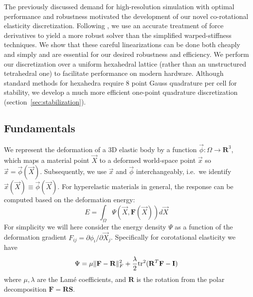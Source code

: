 The previously discussed demand for high-resolution simulation with optimal
performance and robustness motivated the development of our novel co-rotational
elasticity discretization. Following \cite{Chao:2010:SGM}, we use an accurate
treatment of force derivatives to yield a more robust solver than the
simplified warped-stiffness techniques. We show that these careful
linearizations can be done both cheaply and simply and are essential for our desired
robustness and efficiency. We perform our discretization over a
uniform hexahedral lattice  (rather than an unstructured tetrahedral one) to
facilitate performance on modern hardware. Although standard methods for
hexahedra require 8 point Gauss quadrature per cell for stability, we develop a
much more efficient one-point quadrature discretization
(section~\ref{sec:stabilization}).
\subsection{Fundamentals}
\label{sec:fundamentals}

We represent the deformation of a 3D elastic body by a function $\vec{\phi}:\Omega\rightarrow\mathbf{R}^3$, which maps a material point
$\vec{X}$ to a deformed world-space point $\vec{x}$ so $\vec{x}=\vec{\phi}(\vec{X})$. Subsequently, we use $\vec{x}$ and $\vec{\phi}$ interchangeably,
i.e.\ we identify $\vec{x}(\vec{X})\equiv\vec{\phi}(\vec{X})$. For hyperelastic
materials in general, the response can be computed based on the deformation energy:
\begin{equation}
E=\int_\Omega\Psi(\vec{X},\mathbf{F}(\vec{X}))d\vec{X}
\label{eqn_energy_integral}
\end{equation}
For simplicity we will here consider the energy density $\Psi$ as a function of the
deformation gradient $F_{ij}=\partial\phi_i/\partial\vec{X}_j$. Specifically for
corotational elasticity we have
\begin{equation}
\Psi=\mu\|\mathbf{F}-\mathbf{R}\|_F^2+\frac{\lambda}{2}\mbox{tr}^2(\mathbf{R}^T\mathbf{F}-\mathbf{I})
\label{eqn_energy_F}
\end{equation}
where $\mu,\lambda$ are the Lam\'{e} coefficients, and $\mathbf{R}$ is the rotation from the polar decomposition $\mathbf{F}=\mathbf{RS}$.


